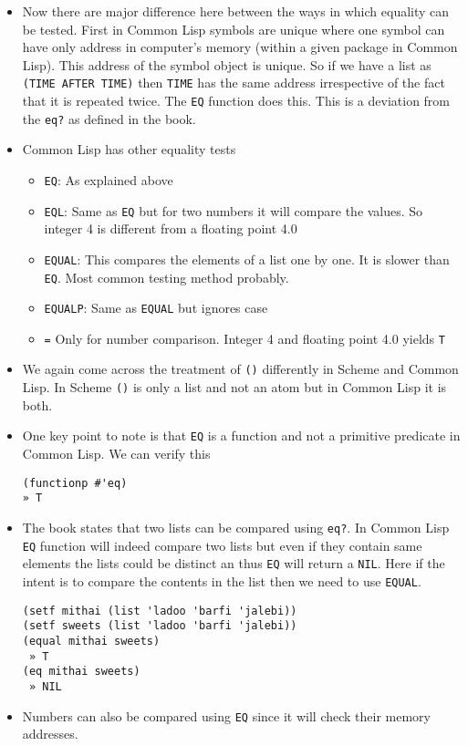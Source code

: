 \documentclass[11pt]{article}
\begin{document}
\begin{itemize}
\item Now there are major difference here between the ways in which equality can be tested. First in Common Lisp symbols
are unique where one symbol can have only address in computer's memory (within a given package in Common Lisp).
This address of the symbol object is unique. So if we have a list as \texttt{(TIME AFTER TIME)} then \texttt{TIME} has the same
address irrespective of the fact that it is repeated twice. The \texttt{EQ} function does this. This is a deviation from the
\texttt{eq?} as defined in the book.
\item Common Lisp has other equality tests
\begin{itemize}
\item \texttt{EQ}: As explained above
\item \texttt{EQL}: Same as \texttt{EQ} but for two numbers it will compare the values. So integer 4 is different from a floating
point 4.0
\item \texttt{EQUAL}: This compares the elements of a list one by one. It is slower than \texttt{EQ}. Most common testing method
probably.
\item \texttt{EQUALP}: Same as \texttt{EQUAL} but ignores case
\item \texttt{=} Only for number comparison. Integer 4 and floating point 4.0 yields \texttt{T}
\end{itemize}
\item We again come across the treatment of \texttt{()} differently in Scheme and Common Lisp. In Scheme \texttt{()} is only a list and
not an atom but in Common Lisp it is both.
\item One key point to note is that \texttt{EQ} is a function and not a primitive predicate in Common Lisp. We can verify this
\begin{verbatim}
(functionp #'eq)
» T
\end{verbatim}
\item The book states that two lists can be compared using \texttt{eq?}. In Common Lisp \texttt{EQ} function will indeed compare two
lists but even if they contain same elements the lists could be distinct an thus \texttt{EQ} will return a \texttt{NIL}. Here if
the intent is to compare the contents in the list then we need to use \texttt{EQUAL}.
\begin{verbatim}
(setf mithai (list 'ladoo 'barfi 'jalebi))
(setf sweets (list 'ladoo 'barfi 'jalebi))
(equal mithai sweets)
 » T
(eq mithai sweets)
 » NIL
\end{verbatim}
\item Numbers can also be compared using \texttt{EQ} since it will check their memory addresses.
\end{itemize}
\end{document}
